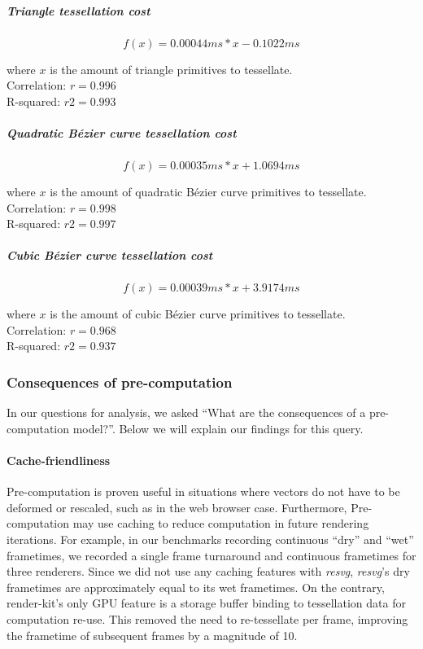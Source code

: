 \subparagraph{Triangle tessellation cost}
\begin{equation}\label{eq:tesscost_triangle}
f(x)=0.00044ms*x-0.1022ms
\end{equation}
\begin{center}
where \(x\) is the amount of triangle primitives to tessellate.\\
Correlation: \(r=0.996\)\\
R-squared:	\(r2=0.993\)
\end{center}

\subparagraph{Quadratic Bézier curve tessellation cost}
\begin{equation}\label{eq:tesscost_quadratic_bezier}
f(x)=0.00035ms*x+1.0694ms
\end{equation}
\begin{center}
where \(x\) is the amount of quadratic Bézier curve primitives to tessellate.\\
Correlation: \(r=0.998\)\\
R-squared:	\(r2=0.997\)
\end{center}

\subparagraph{Cubic Bézier curve tessellation cost}
\begin{equation}\label{eq:tesscost_cubic_bezier}
f(x)=0.00039ms*x+3.9174ms
\end{equation}
\begin{center}
where \(x\) is the amount of cubic Bézier curve primitives to tessellate.\\
Correlation: \(r=0.968\)\\
R-squared:	\(r2=0.937\)
\end{center}

\subsubsection{Consequences of pre-computation}
In our questions for analysis, we asked ``What are the consequences of a pre-computation model?''. Below we will explain our findings for this query.\medskip

\paragraph{Cache-friendliness}
Pre-computation is proven useful in situations where vectors do not have to be deformed or rescaled, such as in the web browser case. Furthermore, Pre-computation may use caching to reduce computation in future rendering iterations. For example, in our benchmarks recording continuous ``dry'' and ``wet'' frametimes, we recorded a single frame turnaround and continuous frametimes for three renderers. Since we did not use any caching features with \textit{resvg}, \textit{resvg}'s dry frametimes are approximately equal to its wet frametimes. On the contrary, render-kit's only GPU feature is a storage buffer binding to tessellation data for computation re-use. This removed the need to re-tessellate per frame, improving the frametime of subsequent frames by a magnitude of 10.

